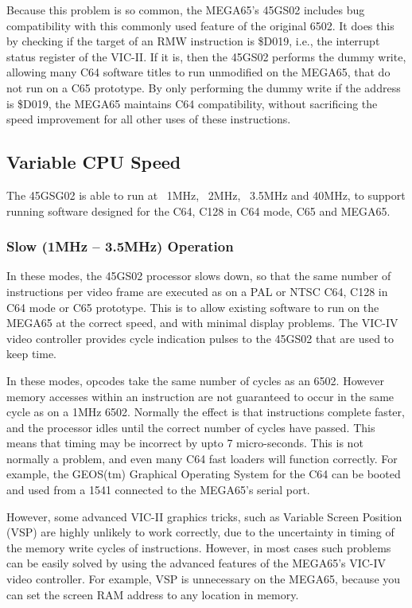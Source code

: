 Because this problem is so common, the MEGA65's 45GS02 includes bug compatibility with this
commonly used feature of the original 6502.  It does this by checking if the target of an RMW
instruction is \$D019, i.e., the interrupt status register of the VIC-II.  If it is, then
the 45GS02 performs the dummy write, allowing many C64 software titles to run unmodified on the
MEGA65, that do not run on a C65 prototype.  By only performing the dummy write if the address
is \$D019, the MEGA65 maintains C64 compatibility, without sacrificing the speed improvement
for all other uses of these instructions.

\subsection{Variable CPU Speed}

The 45GSG02 is able to run at ~1MHz, ~2MHz, ~3.5MHz and 40MHz, to support running software
designed for the C64, C128 in C64 mode, C65 and MEGA65.

\subsubsection{Slow (1MHz -- 3.5MHz) Operation}
In these modes, the 45GS02 processor slows down, so that the same number of instructions
per video frame are executed as on a PAL or NTSC C64, C128 in C64 mode or C65 prototype.
This is to allow existing software to run on the MEGA65 at the correct speed, and with
minimal display problems.  The VIC-IV video controller provides cycle indication pulses
to the 45GS02 that are used to keep time.

In these modes, opcodes take the same number of cycles as an 6502.  However memory accesses within an
instruction are not guaranteed to occur in the same cycle as on a 1MHz 6502.  Normally
the effect is that instructions complete faster, and the processor idles until the
correct number of cycles have passed. This means that timing may be incorrect by upto
7 micro-seconds.  This is not normally a problem, and even many C64 fast loaders will
function correctly. For example, the GEOS(tm) Graphical Operating System for the C64
can be booted and used from a 1541 connected to the MEGA65's serial port.

However, some advanced VIC-II graphics tricks, such as Variable Screen Position (VSP) are
highly unlikely to work correctly, due to the uncertainty in timing of the memory write
cycles of instructions.  However, in most cases such problems can be easily solved by using
the advanced features of the MEGA65's VIC-IV video controller.  For example, VSP is unnecessary
on the MEGA65, because you can set the screen RAM address to any location in memory.

